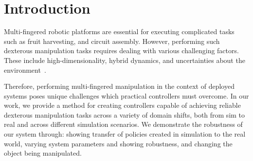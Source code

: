 \documentclass[letterpaper, 10 pt, conference]{ieeeconf}  %
\begin{document}

\section{Introduction}

% 

Multi-fingered robotic platforms are essential for executing complicated tasks such as fruit harvesting, and circuit assembly. However, performing such dexterous manipulation tasks requires dealing with various challenging factors. These include high-dimensionality, hybrid dynamics, and uncertainties about the environment~\cite{okamura2000overview}.

Therefore, performing multi-fingered manipulation in the context of deployed systems poses unique challenges which practical controllers must overcome. In our work, we provide a method for creating controllers capable of achieving reliable dexterous manipulation tasks across a variety of domain shifts, both from sim to real and across different simulation scenarios. We demonstrate the robustness of our system through: showing transfer of policies created in simulation to the real world, varying system parameters and showing robustness, and changing the object being manipulated.
\end{document}
